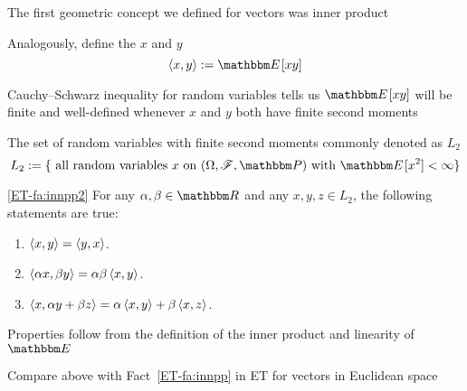 \begin{frame}

    \vspace{2em}
    The first geometric concept we defined for vectors was inner product
    
    Analogously, define the  $x$ and $y$
    \begin{equation*}
        \label{eq:ipl2}
        \inner{x, y} := \EE[xy]
    \end{equation*}
    
    \vspace{1em}
    Cauchy--Schwarz
    inequality for random variables tells us
    $\EE[xy]$ will
    be finite and well-defined whenever $x$ and $y$ both have finite second
    moments
    
\end{frame}

\begin{frame}
    
    \vspace{2em}
    The set of random variables with finite second moments commonly denoted as $L_2$ 
    \begin{equation*}
        L_2 
        := \{ \text{ all random variables } x \text{ on } (\Omega, \fF, \PP)
        \text{ with } \EE [x^2] < \infty \}
    \end{equation*}

    \Fact\eqref{ET-fa:innpp2}
    For any $\alpha, \beta \in \RR$ and any $x, y, z \in L_2$, the following 
    statements are true:
    \begin{enumerate}
        \item $\left\langle{x, y}\right\rangle = \left\langle{y, x}\right\rangle$.
        \item $\left\langle{\alpha x, \beta y}\right\rangle =  \alpha \beta \left\langle{x, y}\right\rangle$.
        \item $\left\langle{x, \alpha y + \beta z}\right\rangle =  \alpha
            \left\langle{x, y}\right\rangle + \beta \left\langle{x, z}\right\rangle$.
    \end{enumerate}
    Properties  follow from the definition of the inner product and linearity of $\EE$
    
    Compare above with Fact~\ref{ET-fa:innpp} in ET for vectors in Euclidean space 
    
\end{frame}

